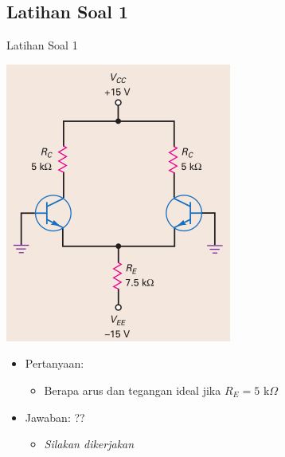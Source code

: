 \documentclass[aspectratio=169]{beamer}
\begin{document}
\subsection{Latihan Soal 1}
\begin{frame}{Latihan Soal 1}
	\begin{multicols}{2}
		\begin{center}
			\includegraphics[width=0.6\textheight]{gambar/01.latihan_soal_1a}
		\end{center}
		\columnbreak
		\begin{itemize}
			\item Pertanyaan:
			\begin{itemize}
				\item Berapa arus dan tegangan ideal jika $ R_E = 5 \text{ k}\Omega $
			\end{itemize}
			\item Jawaban: ??
			\begin{itemize}
				\item \textit{Silakan dikerjakan}
			\end{itemize}
		\end{itemize}
		\vfill\null
	\end{multicols}
\end{frame}
\end{document}
